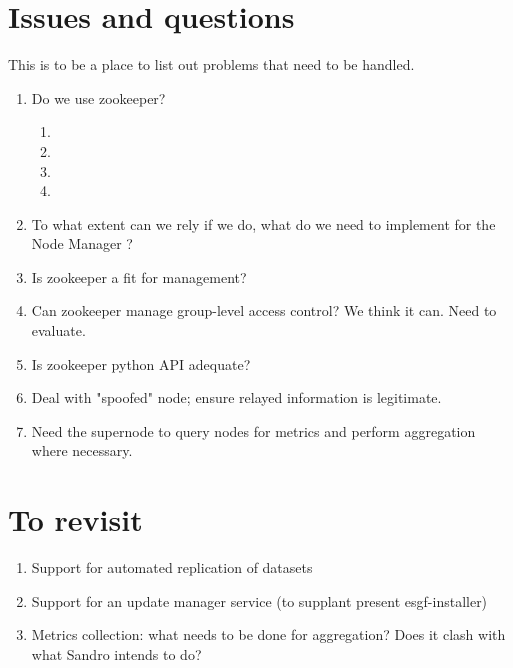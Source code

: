 \documentclass[oneside,12pt]{memoir}
\def\nm{Node Manager{ }}
\begin{document}
\section{Issues and questions}
This is to be a place to list out problems that need to be handled.
\begin{enumerate}
\item
Do we use zookeeper?
\begin{enumerate}
\item {}
\item {}
\item {}
\item {} 
\end{enumerate}
\item
To what extent can we rely if we do,  what do we need to implement for the \nm?
\item

Is zookeeper a fit for management?
\item
Can zookeeper manage group-level access control?  We think it can.  Need to evaluate.
\item
Is zookeeper python API adequate?

\item
Deal with "spoofed" node; ensure relayed information is legitimate. 
\item
Need the supernode to query nodes for metrics and perform aggregation where necessary.

\end{enumerate}
\section{To revisit}
\begin{enumerate}
\item Support for automated replication of datasets
\item Support for an update manager service (to supplant present esgf-installer)
\item Metrics collection: what needs to be done for aggregation? Does it clash with what Sandro intends to do?
\end{enumerate}
\printbibliography
\hypertarget{mymarker}{}
\printindex
\end{document}
